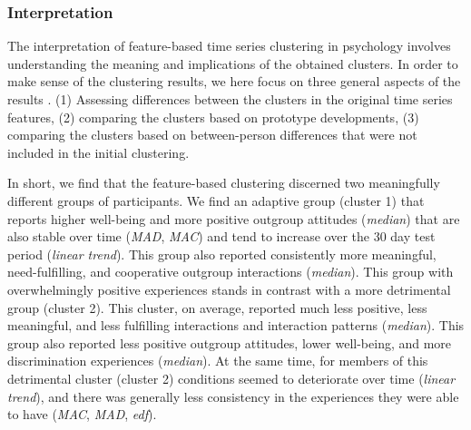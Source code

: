 \documentclass[man, 12pt, a4paper, floatsintext]{apa7}
\theoremstyle{break}
\theoremstyle{plain}
\begin{document}
\subsubsection{Interpretation}
The interpretation of feature-based time series clustering in psychology involves understanding the meaning and implications of the obtained clusters. In order to make sense of the clustering results, we here focus on three general aspects of the results \citep{kaufman1990}. (1) Assessing differences between the clusters in the original time series features, (2) comparing the clusters based on prototype developments, (3) comparing the clusters based on between-person differences that were not included in the initial clustering.

In short, we find that the feature-based clustering discerned two
meaningfully different groups of participants. We find an adaptive group
(cluster 1) that reports higher well-being and more positive outgroup
attitudes (\textit{median}) that are also stable over time
(\textit{MAD}, \textit{MAC}) and tend to increase over the 30 day test
period (\textit{linear trend}). This group also reported consistently
more meaningful, need-fulfilling, and cooperative outgroup interactions
(\textit{median}). This group with overwhelmingly positive experiences
stands in contrast with a more detrimental group (cluster 2). This
cluster, on average, reported much less positive, less meaningful, and
less fulfilling interactions and interaction patterns (\textit{median}).
This group also reported less positive outgroup attitudes, lower
well-being, and more discrimination experiences (\textit{median}). At
the same time, for members of this detrimental cluster (cluster 2)
conditions seemed to deteriorate over time (\textit{linear trend}), and
there was generally less consistency in the experiences they were able
to have (\textit{MAC}, \textit{MAD}, \textit{edf}).
\end{document}
